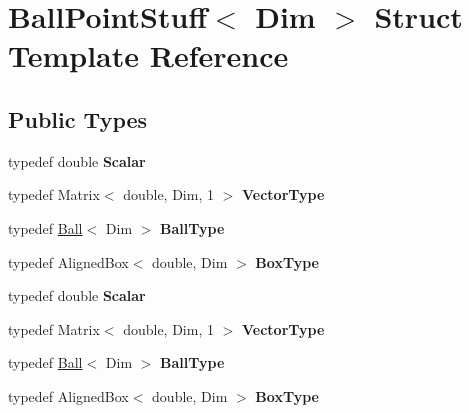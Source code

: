 \hypertarget{struct_ball_point_stuff}{}\section{Ball\+Point\+Stuff$<$ Dim $>$ Struct Template Reference}
\label{struct_ball_point_stuff}
\subsection*{Public Types}
\begin{DoxyCompactItemize}
\item 
\mbox{\label{struct_ball_point_stuff_a9abb441fdc3ee8d174544fd0a886e16f}} 
typedef double {\bfseries Scalar}
\item 
\mbox{\label{struct_ball_point_stuff_ad28c35c35ec23d8ca99ec0fd5f9680ce}} 
typedef Matrix$<$ double, Dim, 1 $>$ {\bfseries Vector\+Type}
\item 
\mbox{\label{struct_ball_point_stuff_ac349707cb8f921f556d67d9e78c10963}} 
typedef \hyperlink{struct_ball}{Ball}$<$ Dim $>$ {\bfseries Ball\+Type}
\item 
\mbox{\label{struct_ball_point_stuff_a409930ee0df5dca8737b5ea508307ebc}} 
typedef Aligned\+Box$<$ double, Dim $>$ {\bfseries Box\+Type}
\item 
\mbox{\label{struct_ball_point_stuff_a9abb441fdc3ee8d174544fd0a886e16f}} 
typedef double {\bfseries Scalar}
\item 
\mbox{\label{struct_ball_point_stuff_ad28c35c35ec23d8ca99ec0fd5f9680ce}} 
typedef Matrix$<$ double, Dim, 1 $>$ {\bfseries Vector\+Type}
\item 
\mbox{\label{struct_ball_point_stuff_ac349707cb8f921f556d67d9e78c10963}} 
typedef \hyperlink{struct_ball}{Ball}$<$ Dim $>$ {\bfseries Ball\+Type}
\item 
\mbox{\label{struct_ball_point_stuff_a409930ee0df5dca8737b5ea508307ebc}} 
typedef Aligned\+Box$<$ double, Dim $>$ {\bfseries Box\+Type}
\end{DoxyCompactItemize}
